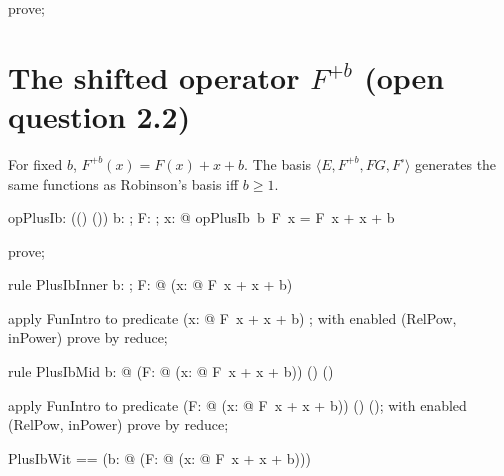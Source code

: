 \documentclass{article}
\begin{document}

\begin{zproof}
prove;
\end{zproof}

\section{The shifted operator $F^{+b}$ (open question 2.2)}

For fixed $b$, $F^{+b}(x) = F(x) + x + b$. The basis $\langle E, F^{+b}, FG, F^\square \rangle$ generates
the same functions as Robinson's basis iff $b \geq 1$.

\begin{axdef}
  opPlusIb: \nat \fun ((\nat \fun \nat) \fun (\nat \fun \nat))
\where
   \forall b: \nat; F: \nat \fun \nat; x: \nat @ opPlusIb~b~F~x = F~x + x + b
\end{axdef}

\begin{zproof}
prove;
\end{zproof}

\begin{theorem}{rule PlusIbInner}
  \forall b: \nat; F: \nat \fun \nat @ (\lambda x: \nat @ F~x + x + b) \in \nat \fun \nat
\end{theorem}

\begin{zproof}
apply FunIntro to predicate (\lambda x: \nat @ F~x + x + b) \in \nat \fun \nat;
with enabled (RelPow, inPower) prove by reduce;
\end{zproof}

\begin{theorem}{rule PlusIbMid}
  \forall b: \nat @ (\lambda F: \nat \fun \nat @ (\lambda x: \nat @ F~x + x + b)) \in (\nat \fun \nat) \fun (\nat \fun \nat)
\end{theorem}

\begin{zproof}
apply FunIntro to predicate (\lambda F: \nat \fun \nat @ (\lambda x: \nat @ F~x + x + b)) \in (\nat \fun \nat) \fun (\nat \fun \nat);
with enabled (RelPow, inPower) prove by reduce;
\end{zproof}

\begin{zed}
  PlusIbWit == (\lambda b: \nat @ (\lambda F: \nat \fun \nat @ (\lambda x: \nat @ F~x + x + b)))
\end{zed}
\end{document}
